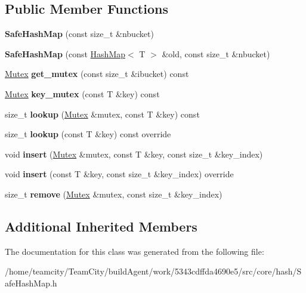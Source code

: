 \subsection*{Public Member Functions}
\begin{DoxyCompactItemize}
\item 
{\bfseries Safe\+Hash\+Map} (const size\+\_\+t \&nbucket)\hypertarget{classSafeHashMap_a495f302cfbdd81566cfc9a8c5f7d8a98}{}\label{classSafeHashMap_a495f302cfbdd81566cfc9a8c5f7d8a98}

\item 
{\bfseries Safe\+Hash\+Map} (const \hyperlink{classHashMap}{Hash\+Map}$<$ T $>$ \&old, const size\+\_\+t \&nbucket)\hypertarget{classSafeHashMap_af9ebb989c318b4bb9dea8aaf2b03e6a6}{}\label{classSafeHashMap_af9ebb989c318b4bb9dea8aaf2b03e6a6}

\item 
\hyperlink{classMutex}{Mutex} {\bfseries get\+\_\+mutex} (const size\+\_\+t \&ibucket) const \hypertarget{classSafeHashMap_a8662146dbaf25f047544a90efedfadb0}{}\label{classSafeHashMap_a8662146dbaf25f047544a90efedfadb0}

\item 
\hyperlink{classMutex}{Mutex} {\bfseries key\+\_\+mutex} (const T \&key) const \hypertarget{classSafeHashMap_a43f3929696652e2073c903a4182ddfa7}{}\label{classSafeHashMap_a43f3929696652e2073c903a4182ddfa7}

\item 
size\+\_\+t {\bfseries lookup} (\hyperlink{classMutex}{Mutex} \&mutex, const T \&key) const \hypertarget{classSafeHashMap_a85d03b86b12807d939a4f99a5451403f}{}\label{classSafeHashMap_a85d03b86b12807d939a4f99a5451403f}

\item 
size\+\_\+t {\bfseries lookup} (const T \&key) const override\hypertarget{classSafeHashMap_a90e15cc1085a1cea651db42e393da55f}{}\label{classSafeHashMap_a90e15cc1085a1cea651db42e393da55f}

\item 
void {\bfseries insert} (\hyperlink{classMutex}{Mutex} \&mutex, const T \&key, const size\+\_\+t \&key\+\_\+index)\hypertarget{classSafeHashMap_a87f3674c29490f34023e427f84811974}{}\label{classSafeHashMap_a87f3674c29490f34023e427f84811974}

\item 
void {\bfseries insert} (const T \&key, const size\+\_\+t \&key\+\_\+index) override\hypertarget{classSafeHashMap_a04620cef04074339b86368bfffef9151}{}\label{classSafeHashMap_a04620cef04074339b86368bfffef9151}

\item 
size\+\_\+t {\bfseries remove} (\hyperlink{classMutex}{Mutex} \&mutex, const size\+\_\+t \&key\+\_\+index)\hypertarget{classSafeHashMap_af37c6507b466dd6e36af3d0a9f556be7}{}\label{classSafeHashMap_af37c6507b466dd6e36af3d0a9f556be7}

\end{DoxyCompactItemize}
\subsection*{Additional Inherited Members}


The documentation for this class was generated from the following file\+:\begin{DoxyCompactItemize}
\item 
/home/teamcity/\+Team\+City/build\+Agent/work/5343cdffda4690e5/src/core/hash/Safe\+Hash\+Map.\+h\end{DoxyCompactItemize}
